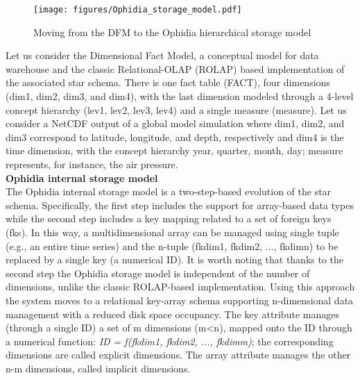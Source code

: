 \begin{figure}
	\centering
	\texttt{[image: figures/Ophidia\_storage\_model.pdf]}
	\caption{Moving from the DFM to the Ophidia hierarchical storage model}
	\label{fig: The Ophidia Storage Model}
\end{figure}

Let us consider the Dimensional Fact Model, a conceptual model for data warehouse and the classic Relational-OLAP (ROLAP) based implementation of the associated star schema. There is one fact table (FACT), four dimensions (dim1, dim2, dim3, and dim4), with the last dimension modeled through a 4-level concept hierarchy (lev1, lev2, lev3, lev4) and a single measure (measure). Let us consider a NetCDF output of a global model simulation where dim1, dim2, and dim3 correspond to latitude, longitude, and depth, respectively and dim4 is the time dimension, with the concept hierarchy year, quarter, month, day; measure represents, for instance, the air pressure.\\

\textbf{Ophidia internal storage model}\\

The Ophidia internal storage model is a two-step-based evolution of the star schema. Specifically, the first step includes the support for array-based data types while the second step includes a key mapping related to a set of foreign keys (fks). In this way, a multidimensional array can be managed using single tuple (e.g., an entire time series) and the n-tuple (fk\textunderscore dim1, fk\textunderscore dim2, ..., fk\textunderscore dimn) to be replaced by a single key (a numerical ID). It is worth noting that thanks to the second step the Ophidia storage model is independent of the number of dimensions, unlike the classic ROLAP-based implementation. Using this approach the system moves to a relational key-array schema supporting n-dimensional data management with a reduced disk space occupancy. The key attribute manages (through a single ID) a set of m dimensions (m<n), mapped onto the ID through a numerical function: \textit{ID = f(fk\textunderscore dim1, fk\textunderscore dim2, ..., fk\textunderscore dimm)}; the corresponding dimensions are called explicit dimensions. The array attribute manages the other n-m dimensions, called implicit dimensions.


